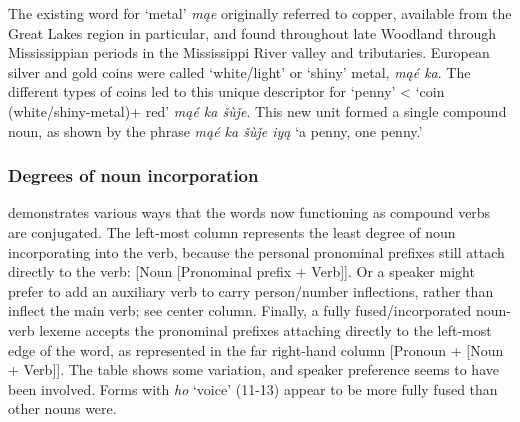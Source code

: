\documentclass[output=paper]{LSP/langsci}
\begin{document}
The existing word for `metal' \textit{m\k{a}e} originally referred to copper, available from the Great Lakes region in particular, and found throughout late Woodland through Mississippian periods in the Mississippi River valley and tributaries.  European silver and gold coins were called `white/light' or `shiny' metal, \textit{m\k{a}\'e ka}. The different types of coins led to this unique descriptor for `penny' < `coin (white/shiny-metal)+ red' \textit{m\k{a}\'e ka \v{s}\`u\v{j}e}.  This new unit formed a single compound noun, as shown by the phrase \textit{m\k{a}\'e ka \v{s}\`u\v{j}e iy\k{a}} `a penny, one penny.'

\subsubsection{Degrees of  noun incorporation}
 demonstrates various ways that the words now functioning as compound verbs are conjugated.  The left-most column represents the least degree of noun incorporating into the verb, because the personal pronominal prefixes still attach directly to the verb: [Noun [Pronominal prefix + Verb]]. Or a speaker might prefer to add an auxiliary verb to carry person/number inflections, rather than inflect the main verb; see center column. Finally, a fully fused/incorporated noun-verb lexeme accepts the pronominal prefixes attaching directly to the left-most edge of the word, as represented in the far right-hand column [Pronoun + [Noun + Verb]].  The table shows some variation, and speaker preference seems to have been involved. Forms with \textit{ho} `voice' (11-13) appear to be more fully fused than other nouns were.    
\end{document}
